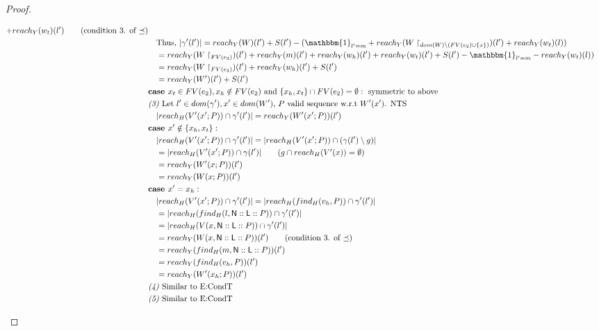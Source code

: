 \documentclass[11pt]{article}
\newcommand{\ms}[1]{\ensuremath{\mathsf{#1}}}
\theoremstyle{definition}
\begin{document}
\begin{proof}
\begin{description}
\begin{align*}
			+ reach_Y(w_t)(l') \tag{condition 3. of $\preceq$}\\
		&\quad \text{Thus, } |\gamma'(l')| = 
			reach_Y(W)(l') + S(l') - (\mathbbm{1}_{l' = m}
				+ reach_Y(W\restriction_{dom(W)\setminus (FV(e_2) \cup \{x\})})(l') + reach_Y(w_t)(l))\\
		&\quad = reach_Y(W\restriction_{FV(e_2)})(l') + 
			reach_Y(m)(l') + reach_Y(w_h)(l') + reach_Y(w_t)(l') + S(l') - \mathbbm{1}_{l' = m} 
				- reach_Y(w_t)(l)) \\
		&\quad = reach_Y(W\restriction_{FV(e_2)})(l') + 
			reach_Y(w_h)(l') + S(l')\\
		&\quad = reach_Y(W')(l') +  S(l')\\
		&\textbf{case } x_t \in FV(e_2), x_h \notin FV(e_2) \text{ and } 
			\{x_h,x_t\} \cap FV(e_2) = \emptyset: \text{ symmetric to above }\\
		&\emph{(3) } \text{Let $l' \in dom(\gamma'), x' \in dom(W')$, 
			$P$ valid sequence w.r.t $W'(x')$. NTS }\\ 
		&\quad|reach_{H}(V'(x';P)) \cap \gamma'(l')| = reach_{Y}(W'(x';P))(l')\\ 
		&\textbf{case } x' \notin \{x_h,x_t\}:\\
		&\quad |reach_{H}(V'(x';P)) \cap \gamma'(l')| = 
			|reach_{H}(V'(x';P)) \cap (\gamma(l')\setminus g)| \\
		&\quad = |reach_{H}(V'(x';P)) \cap \gamma(l')| \tag{$g \cap reach_H(V'(x)) = \emptyset$}\\ 
		&\quad = reach_Y(W'(x;P))(l') \\
		&\quad = reach_Y(W(x;P))(l') \\
		&\textbf{case } x' = x_h:\\
		&\quad |reach_{H}(V'(x';P)) \cap \gamma'(l')| = |reach_{H}(find_H(v_h,P)) \cap \gamma'(l')|\\
		&\quad = |reach_{H}(find_H(l,\ms{N}::\ms{L}::P)) \cap \gamma'(l')|\\
		&\quad = |reach_{H}(V(x,\ms{N}::\ms{L}::P)) \cap \gamma'(l')|\\
		&\quad = reach_{Y}(W(x,\ms{N}::\ms{L}::P))(l') \tag{condition 3. of $\preceq$}\\
		&\quad = reach_{Y}(find_H(m,\ms{N}::\ms{L}::P))(l') \\
		&\quad = reach_{Y}(find_H(v_h,P))(l') \\
		&\quad = reach_{Y}(W'(x_h;P))(l') \\
		&\emph{(4) } \text{Similar to E:CondT}\\
		&\emph{(5) } \text{Similar to E:CondT}\\

\end{align*}
\end{description}
\end{proof}
\end{document}
